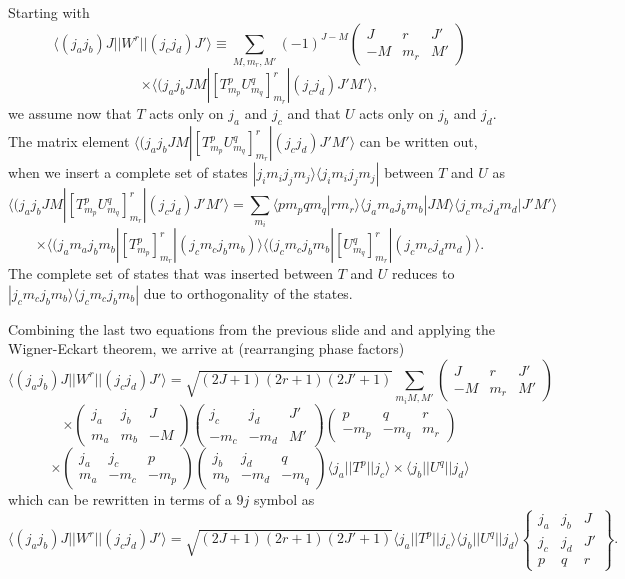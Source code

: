\documentclass[graybox,sectrefs,envcountresetchap,open=right]{svmonodo}
\begin{document}
Starting with
\[
\langle (j_aj_b)J||W^{r}||(j_cj_d)J'\rangle\equiv\sum_{M,m_r,M'}(-1)^{J-M}\left(\begin{array}{ccc}  J & r & J' \\ -M & m_r & M'\end{array}\right)
\]
\[
\times\langle (j_aj_bJM|\left[ T^{p}_{m_p}U^{q}_{m_q} \right]^{r}_{m_r}|(j_cj_d)J'M'\rangle,
\]
we assume now that $T$ acts only on $j_a$ and $j_c$ and that $U$ acts only on $j_b$ and $j_d$. 
The matrix element $\langle (j_aj_bJM|\left[ T^{p}_{m_p}U^{q}_{m_q} \right]^{r}_{m_r}|(j_cj_d)J'M'\rangle$ can be written out,
when we insert a complete set of states $|j_im_ij_jm_j\rangle\langle j_im_ij_jm_j|$ between $T$ and $U$ as
\[
\langle (j_aj_bJM|\left[ T^{p}_{m_p}U^{q}_{m_q} \right]^{r}_{m_r}|(j_cj_d)J'M'\rangle=\sum_{m_i}\langle pm_pqm_q|rm_r\rangle\langle j_am_aj_bm_b|JM\rangle\langle j_cm_cj_dm_d|J'M'\rangle
\]
\[
\times \langle (j_am_aj_bm_b|\left[ T^{p}_{m_p}\right]^{r}_{m_r}|(j_cm_cj_bm_b)\rangle\langle (j_cm_cj_bm_b|\left[ U^{q}_{m_q}\right]^{r}_{m_r}|(j_cm_cj_dm_d)\rangle.
\]
The complete set of states that was inserted between $T$ and $U$ reduces to $|j_cm_cj_bm_b\rangle\langle j_cm_cj_bm_b|$
due to orthogonality of the states. 




Combining the last two equations from the previous slide and 
and applying the Wigner-Eckart theorem, we arrive at (rearranging phase factors)
\[
\langle (j_aj_b)J||W^{r}||(j_cj_d)J'\rangle=\sqrt{(2J+1)(2r+1)(2J'+1)}\sum_{m_iM,M'}\left(\begin{array}{ccc}  J & r & J' \\ -M & m_r & M'\end{array}\right)
\]
\[
\times\left(\begin{array}{ccc} j_a  &j_b  & J \\ m_a &m_b &-M \end{array}\right)
\left(\begin{array}{ccc} j_c  &j_d  &J'  \\ -m_c &-m_d &M' \end{array}\right)
\left(\begin{array}{ccc} p  & q & r \\  -m_p&-m_q &m_r \end{array}\right)
\]
\[
\times\left(\begin{array}{ccc} j_a  &j_c  &p  \\ m_a &-m_c &-m_p \end{array}\right)\left(\begin{array}{ccc} j_b  &j_d  &q  \\ m_b &-m_d &-m_q \end{array}\right)\langle j_a||T^p||j_c\rangle \times \langle j_b||U^q||j_d\rangle
\]
which can be rewritten in terms of a $9j$ symbol as 
\[
\langle (j_aj_b)J||W^{r}||(j_cj_d)J'\rangle=\sqrt{(2J+1)(2r+1)(2J'+1)}\langle j_a||T^p||j_c\rangle  \langle j_b||U^q||j_d\rangle\left\{\begin{array}{ccc} j_a & j_b& J \\ j_c & j_d & J' \\ p & q& r\end{array}\right\}.
\]
\end{document}
